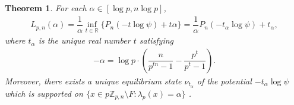 \documentclass[11pt]{amsart}
\newtheorem{theorem}{Theorem}[section]
\theoremstyle{remark}
\numberwithin{equation}{section}
\newcommand{\R}{\mathbb{R}}
\newcommand{\Z}{\mathbb{Z}}
\begin{document}
\begin{theorem}\label{LyapunovSpectrumCompactAproximation}
    For each $\alpha \in[\log p,n\log p]$,
    \begin{align}\label{ECCU}
        L_{p,n}(\alpha)=\dfrac{1}{\alpha}\inf_{t\in \R}\{P_{n}(-t\log \psi )+t\alpha\}=\dfrac{1}{\alpha}P_{n}(-t_{\alpha}\log\psi)+t_{\alpha},
    \end{align}where $t_{\alpha}$ is the unique real number $t$ satisfying 
    \begin{align}\label{ECCU2}
        -\alpha=\log p\cdot  \left(\dfrac{n}{p^{tn}-1}-\dfrac{p^{t}}{p^{t}-1}\right).
    \end{align}
    Moreover, there exists a unique equilibrium state $\nu_{t_{\alpha}}$ of the potential $-t_{\alpha}\log\psi$ which is supported on  $\{x\in p\Z_{p,n}\setminus F:\lambda_{p}(x)=\alpha\}$ .
\end{theorem}
\end{document}
